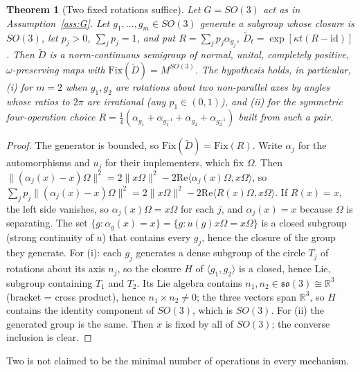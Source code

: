 \documentclass[12pt]{article}
\newtheorem{theorem}{Theorem}[section]
\theoremstyle{definition}
\theoremstyle{remark}
\begin{document}
\begin{theorem}[Two fixed rotations suffice]\label{thm:four}
Let \(G=SO(3)\) act as in Assumption~\ref{ass:G}. Let \(g_1,\dots,g_m\in SO(3)\) generate a
subgroup whose closure is \(SO(3)\), let \(p_j>0\), \(\sum_jp_j=1\), and put
\(R=\sum_jp_j\alpha_{g_j}\), \(\tilde D_t=\exp[\kappa t(R-\mathrm{id})]\). Then \(\tilde D\) is a
norm-continuous semigroup of normal, unital, completely positive, \(\omega\)-preserving maps with
\(\mathrm{Fix}(\tilde D)=M^{SO(3)}\). The hypothesis holds, in particular,
(i) for \(m=2\) when \(g_1,g_2\) are rotations about two non-parallel axes by angles whose
ratios to \(2\pi\) are irrational (any \(p_1\in(0,1)\)), and (ii) for the symmetric four-operation
choice \(R=\tfrac14(\alpha_{g_1}+\alpha_{g_1^{-1}}+\alpha_{g_2}+\alpha_{g_2^{-1}})\) built from such a pair.
\end{theorem}
\begin{proof}
The generator is bounded, so \(\mathrm{Fix}(\tilde D)=\mathrm{Fix}(R)\). Write
\(\alpha_j\) for the automorphisms and \(u_j\) for their implementers, which
fix \(\Omega\). Then \(\|(\alpha_j(x)-x)\Omega\|^2=2\|x\Omega\|^2-2\mathrm{Re}\langle\alpha_j(x)\Omega,x\Omega\rangle\),
so
\(\sum_jp_j\|(\alpha_j(x)-x)\Omega\|^2=2\|x\Omega\|^2-2\mathrm{Re}\langle R(x)\Omega,x\Omega\rangle\).
If \(R(x)=x\), the left side vanishes, so \(\alpha_j(x)\Omega=x\Omega\) for each \(j\),
and \(\alpha_j(x)=x\) because \(\Omega\) is separating. The set \(\{g:\alpha_g(x)=x\}=\{g:u(g)x\Omega=x\Omega\}\)
is a closed subgroup (strong continuity of \(u\)) that contains every \(g_j\), hence the closure of the
group they generate. For (i): each \(g_j\) generates a dense subgroup of the circle \(T_j\) of rotations
about its axis \(n_j\), so the closure \(H\) of \(\langle g_1,g_2\rangle\) is a closed, hence Lie, subgroup
containing \(T_1\) and \(T_2\). Its Lie algebra contains \(n_1,n_2\in\mathfrak{so}(3)\cong\mathbb R^3\) (bracket = cross
product), hence \(n_1\times n_2\ne0\); the three vectors span \(\mathbb R^3\), so \(H\) contains the
identity component of \(SO(3)\), which is \(SO(3)\). For (ii) the generated group is the same.
Then \(x\) is fixed by all of \(SO(3)\); the converse inclusion is clear.
\end{proof}
Two is not claimed to be the minimal number of operations in every mechanism.
\end{document}
